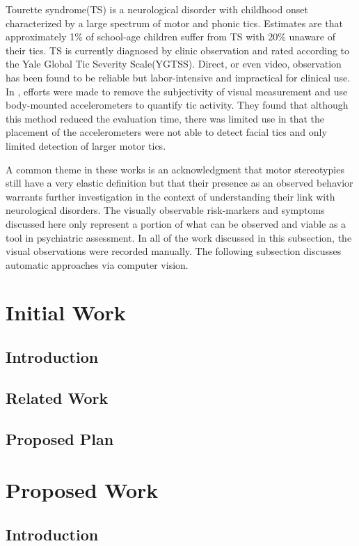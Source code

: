 \documentclass[11pt]{article}
\begin{document}
Tourette syndrome(TS) is a neurological disorder with childhood onset characterized by a large spectrum of motor and phonic tics. Estimates are that approximately 1\% of school-age children suffer from TS with 20\% unaware of their tics. TS is currently diagnosed by clinic observation and rated according to the Yale Global Tic Severity Scale(YGTSS). Direct, or even video, observation has been found to be reliable\cite{walkup1992} but labor-intensive and impractical for clinical use. In \cite{bernabei2010}, efforts were made to remove the subjectivity of visual measurement and use  body-mounted accelerometers to quantify tic activity. They found that although this method reduced the evaluation time, there was limited use in that the placement of the accelerometers were not able to detect facial tics and only limited detection of larger motor tics.

A common theme in these works is an acknowledgment that motor stereotypies still have a very elastic definition but that their presence as an observed behavior warrants further investigation in the context of understanding their link with neurological disorders. The visually observable risk-markers and symptoms discussed here only represent a portion of what can be observed and viable as a tool in psychiatric assessment. In all of the work discussed in this subsection, the visual observations were recorded manually. The following subsection discusses automatic approaches via computer vision.

\section{Initial Work}
\subsection{Introduction}
\subsection{Related Work}
\subsection{Proposed Plan}

\section{Proposed Work}
\subsection{Introduction}
\end{document}
